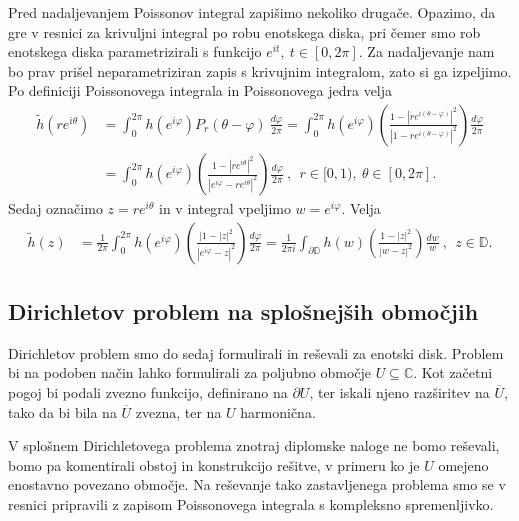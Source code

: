 \documentclass[mat1, tisk]{fmfdelo}
\begin{document}
    Pred nadaljevanjem Poissonov integral zapišimo nekoliko drugače. Opazimo, da gre v resnici za krivuljni integral po robu enotskega diska, pri čemer smo rob enotskega diska parametrizirali s funkcijo $e^{it},~t \in [0,2 \pi]$. 
    Za nadaljevanje nam bo prav prišel neparametriziran zapis s krivujnim integralom, zato si ga izpeljimo. Po definiciji Poissonovega integrala in Poissonovega jedra velja
    \begin{align*}
        \widetilde{h}(r e^{i\theta}) &= \int_{0}^{2\pi}{h(e^{i\varphi}) P_r(\theta - \varphi)~\frac{d\varphi}{2 \pi}} = \int_{0}^{2\pi}{h(e^{i\varphi}) \left(\frac{1 - |r e^{i (\theta - \varphi)}|^2}{|1 - r e^{i (\theta - \varphi)}|^2}\right)\frac{d\varphi}{2 \pi}} \\
        & = \int_{0}^{2\pi}{h(e^{i\varphi}) \left(\frac{1 - |r e^{i \theta}|^2}{|e^{i \varphi} - r e^{i \theta}|^2}\right)\frac{d\varphi}{2 \pi}}~,~~ r \in [0,1),~\theta \in [0,2 \pi].
    \end{align*}
    Sedaj označimo $z = re^{i \theta}$ in v integral vpeljimo $w = e^{i \varphi}$. Velja
    \begin{align}
        \label{pi_kompl}
        \widetilde{h}(z) &= \frac{1}{2\pi}\int_{0}^{2\pi}{h(e^{i\varphi}) \left(\frac{|1 - |z|^2}{|e^{i \varphi} - z|^2}\right)\frac{d\varphi}{2 \pi}}= \frac{1}{2\pi i}\int_{\partial \mathbb{D}}{h(w) \left(\frac{1 - |z|^2}{|w - z|^2}\right)\frac{dw}{w}}~,~~ z \in \mathbb{D}.
    \end{align}

\subsection{Dirichletov problem na splošnejših območjih}
    Dirichletov problem smo do sedaj formulirali in reševali za enotski disk. Problem bi na podoben način lahko formulirali za poljubno območje $U \subseteq \mathbb{C}$. 
    Kot začetni pogoj bi podali zvezno funkcijo, definirano na $\partial U$, ter iskali njeno razširitev na $\overline{U}$, tako da bi bila na $\overline{U}$ zvezna, ter na $U$ harmonična.
    
    V splošnem Dirichletovega problema znotraj diplomske naloge ne bomo reševali, bomo pa komentirali obstoj in konstrukcijo rešitve, v primeru ko je $U$ omejeno enostavno povezano območje.
    Na reševanje tako zastavljenega problema smo se v resnici pripravili z zapisom Poissonovega integrala s kompleksno spremenljivko.
\end{document}
